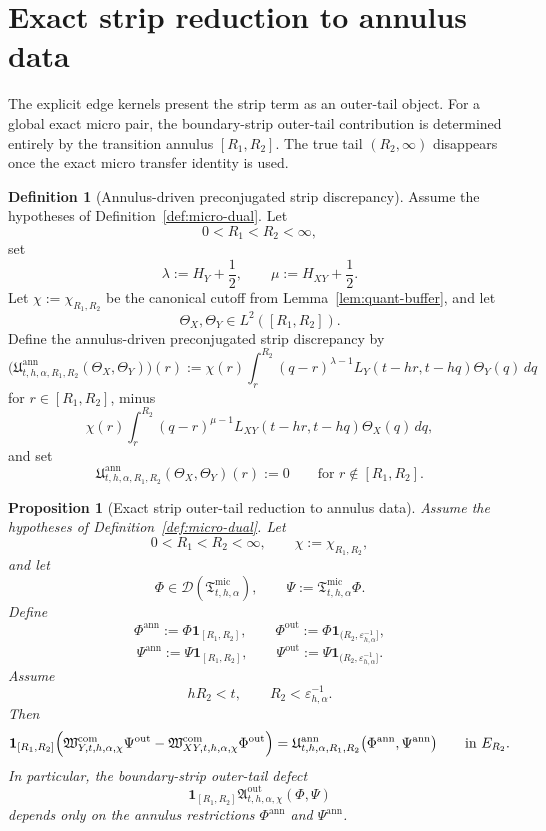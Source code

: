 \documentclass[11pt,a4paper]{amsart}
\theoremstyle{plain}
\newtheorem{proposition}[theorem]{Proposition}
\theoremstyle{definition}
\newtheorem{definition}[theorem]{Definition}
\theoremstyle{remark}
\newcommand{\one}{\mathbf 1}
\begin{document}
\section{Exact strip reduction to annulus data}
\label{sec:strip-annulus}

The explicit edge kernels present the strip term as an outer-tail object.  For a global exact micro
pair, the boundary-strip outer-tail contribution is determined entirely by the transition annulus
\([R_1,R_2]\).  The true tail \((R_2,\infty)\) disappears once the exact micro transfer identity is
used.

\begin{definition}[Annulus-driven preconjugated strip discrepancy]
\label{def:strip-annulus}
Assume the hypotheses of Definition~\ref{def:micro-dual}. Let
\[
0<R_1<R_2<\infty,
\]
set
\[
\lambda:=H_Y+\frac12,
\qquad
\mu:=H_{XY}+\frac12.
\]
Let \(\chi:=\chi_{R_1,R_2}\) be the canonical cutoff from Lemma~\ref{lem:quant-buffer}, and let
\[
\Theta_X,\Theta_Y\in L^2([R_1,R_2]).
\]
Define the annulus-driven preconjugated strip discrepancy by
\begin{equation}\label{eq:strip-annulus}
\bigl(
\mathfrak U_{t,h,\alpha,R_1,R_2}^{\mathrm{ann}}(\Theta_X,\Theta_Y)
\bigr)(r)
:=
\chi(r)
\int_r^{R_2}
(q-r)^{\lambda-1}
L_Y(t-hr,t-hq)\Theta_Y(q)\,dq
\end{equation}
for \(r\in[R_1,R_2]\), minus
\[
\chi(r)
\int_r^{R_2}
(q-r)^{\mu-1}
L_{XY}(t-hr,t-hq)\Theta_X(q)\,dq,
\]
and set
\[
\mathfrak U_{t,h,\alpha,R_1,R_2}^{\mathrm{ann}}(\Theta_X,\Theta_Y)(r):=0
\qquad\text{for }r\notin [R_1,R_2].
\]
\end{definition}

\begin{proposition}[Exact strip outer-tail reduction to annulus data]
\label{prop:strip-annulus}
Assume the hypotheses of Definition~\ref{def:micro-dual}. Let
\[
0<R_1<R_2<\infty,
\qquad
\chi:=\chi_{R_1,R_2},
\]
and let
\[
\Phi\in\mathcal D(\mathfrak T_{t,h,\alpha}^{\mathrm{mic}}),
\qquad
\Psi:=\mathfrak T_{t,h,\alpha}^{\mathrm{mic}}\Phi.
\]
Define
\[
\Phi^{\mathrm{ann}}:=\Phi\one_{[R_1,R_2]},
\qquad
\Phi^{\mathrm{out}}:=\Phi\one_{(R_2,\varepsilon_{h,\alpha}^{-1}]},
\]
\[
\Psi^{\mathrm{ann}}:=\Psi\one_{[R_1,R_2]},
\qquad
\Psi^{\mathrm{out}}:=\Psi\one_{(R_2,\varepsilon_{h,\alpha}^{-1}]}.
\]
Assume
\[
hR_2<t,
\qquad
R_2<\varepsilon_{h,\alpha}^{-1}.
\]
Then
\begin{equation}\label{eq:strip-annulus-identity}
\one_{[R_1,R_2]}
\Bigl(
\mathfrak W_{Y,t,h,\alpha,\chi}^{\mathrm{com}}\Psi^{\mathrm{out}}
-
\mathfrak W_{XY,t,h,\alpha,\chi}^{\mathrm{com}}\Phi^{\mathrm{out}}
\Bigr)
=
\mathfrak U_{t,h,\alpha,R_1,R_2}^{\mathrm{ann}}
\bigl(\Phi^{\mathrm{ann}},\Psi^{\mathrm{ann}}\bigr)
\qquad\text{in }E_{R_2}.
\end{equation}
In particular, the boundary-strip outer-tail defect
\[
\one_{[R_1,R_2]}
\mathfrak A_{t,h,\alpha,\chi}^{\mathrm{out}}(\Phi,\Psi)
\]
depends only on the annulus restrictions \(\Phi^{\mathrm{ann}}\) and \(\Psi^{\mathrm{ann}}\).
\end{proposition}
\end{document}

